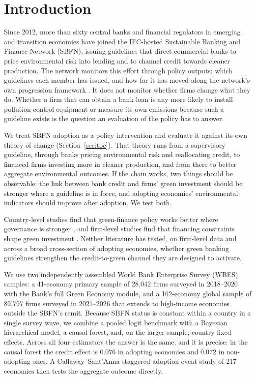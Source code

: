 \documentclass[review,authoryear,12pt]{elsarticle}
\begin{document}
\section{Introduction}
\label{sec:intro}

Since 2012, more than sixty central banks and financial regulators in emerging and transition economies have joined the IFC-hosted Sustainable Banking and Finance Network (SBFN), issuing guidelines that direct commercial banks to price environmental risk into lending and to channel credit towards cleaner production. The network monitors this effort through policy outputs: which guidelines each member has issued, and how far it has moved along the network's own progression framework \citep{ifc2025sbfn}. It does not monitor whether firms change what they do. Whether a firm that can obtain a bank loan is any more likely to install pollution-control equipment or measure its own emissions because such a guideline exists is the question an evaluation of the policy has to answer.

We treat SBFN adoption as a policy intervention and evaluate it against its own theory of change (Section~\ref{sec:toc}). That theory runs from a supervisory guideline, through banks pricing environmental risk and reallocating credit, to financed firms investing more in cleaner production, and from there to better aggregate environmental outcomes. If the chain works, two things should be observable: the link between bank credit and firms' green investment should be stronger where a guideline is in force, and adopting economies' environmental indicators should improve after adoption. We test both.

Country-level studies find that green-finance policy works better where governance is stronger \citep{chi2023,jia2026,shi2024,ullahw2024}, and firm-level studies find that financing constraints shape green investment \citep{costa2024,dehaas2025,ghosh2022}. Neither literature has tested, on firm-level data and across a broad cross-section of adopting economies, whether green banking guidelines strengthen the credit-to-green channel they are designed to activate.

We use two independently assembled World Bank Enterprise Survey (WBES) samples: a 41-economy primary sample of 28{,}042 firms surveyed in 2018--2020 with the Bank's full Green Economy module, and a 162-economy global sample of 89{,}797 firms surveyed in 2021--2026 that extends to high-income economies outside the SBFN's remit. Because SBFN status is constant within a country in a single survey wave, we combine a pooled logit benchmark with a Bayesian hierarchical model, a causal forest, and, on the larger sample, country fixed effects. Across all four estimators the answer is the same, and it is precise: in the causal forest the credit effect is 0.076 in adopting economies and 0.072 in non-adopting ones. A Callaway--Sant'Anna staggered-adoption event study of 217 economies then tests the aggregate outcome directly.
\end{document}

